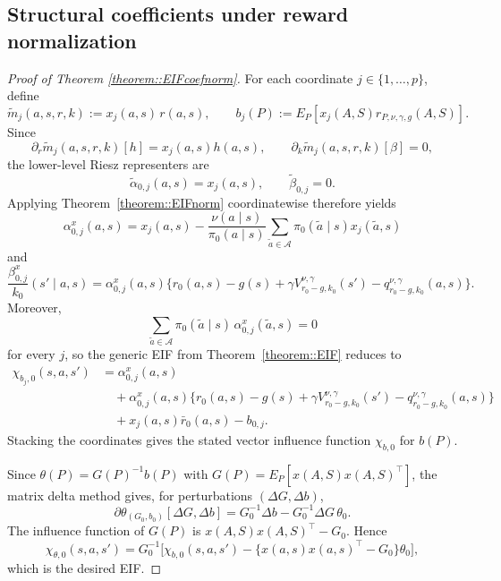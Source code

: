 \documentclass[11pt]{article}
\theoremstyle{plain}
\begin{document}
 


 
 

\subsection{Structural coefficients under reward normalization}

\begin{proof}[Proof of Theorem \ref{theorem::EIFcoefnorm}]
For each coordinate \(j \in \{1,\dots,p\}\), define
\[
\tilde m_j(a,s,r,k) := x_j(a,s)\,r(a,s),
\qquad
b_j(P) := E_P[x_j(A,S)r_{P,\nu,\gamma,g}(A,S)].
\]
Since
\[
\partial_r \tilde m_j(a,s,r,k)[h] = x_j(a,s)h(a,s),
\qquad
\partial_k \tilde m_j(a,s,r,k)[\beta] = 0,
\]
the lower-level Riesz representers are
\[
\tilde \alpha_{0,j}(a,s) = x_j(a,s),
\qquad
\tilde \beta_{0,j} = 0.
\]
Applying Theorem~\ref{theorem::EIFnorm} coordinatewise therefore yields
\[
\alpha_{0,j}^x(a,s)
=
x_j(a,s)
- \frac{\nu(a\mid s)}{\pi_0(a\mid s)}
\sum_{\tilde a \in \mathcal A}\pi_0(\tilde a\mid s)x_j(\tilde a,s)
\]
and
\[
\frac{\beta_{0,j}^x}{k_0}(s'\mid a,s)
=
\alpha_{0,j}^x(a,s)
\bigl\{r_0(a,s)-g(s)+\gamma V_{r_0-g,k_0}^{\nu,\gamma}(s')
-q_{r_0-g,k_0}^{\nu,\gamma}(a,s)\bigr\}.
\]
Moreover,
\[
\sum_{\tilde a \in \mathcal A}\pi_0(\tilde a\mid s)\,\alpha_{0,j}^x(\tilde a,s)=0
\]
for every \(j\), so the generic EIF from Theorem~\ref{theorem::EIF} reduces to
\[
\begin{aligned}
\chi_{b_j,0}(s,a,s')
&=
\alpha_{0,j}^x(a,s) \\
&\quad
+ \alpha_{0,j}^x(a,s)\bigl\{r_0(a,s)-g(s)+\gamma V_{r_0-g,k_0}^{\nu,\gamma}(s')
-q_{r_0-g,k_0}^{\nu,\gamma}(a,s)\bigr\} \\
&\quad
+ x_j(a,s)\bar r_0(a,s)-b_{0,j}.
\end{aligned}
\]
Stacking the coordinates gives the stated vector influence function
\(\chi_{b,0}\) for \(b(P)\).

Since \(\theta(P)=G(P)^{-1}b(P)\) with \(G(P)=E_P[x(A,S)x(A,S)^\top]\), the
matrix delta method gives, for perturbations \((\Delta G,\Delta b)\),
\[
\partial \theta_{(G_0,b_0)}[\Delta G,\Delta b]
=
G_0^{-1}\Delta b - G_0^{-1}\Delta G\,\theta_0.
\]
The influence function of \(G(P)\) is \(x(A,S)x(A,S)^\top - G_0\). Hence
\[
\chi_{\theta,0}(s,a,s')
=
G_0^{-1}\Big[
\chi_{b,0}(s,a,s') - \{x(a,s)x(a,s)^\top - G_0\}\theta_0
\Big],
\]
which is the desired EIF.
\end{proof}
\end{document}
